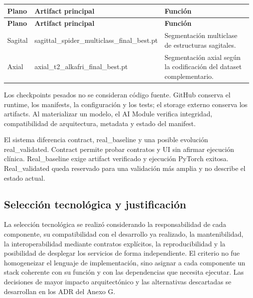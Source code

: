 {\footnotesize
\setlength{\LTleft}{0pt}
\setlength{\LTright}{0pt}
\setlength{\tabcolsep}{2pt}
\renewcommand{\arraystretch}{1.18}
\label{tab:arch-artifacts-modelos}
\begin{longtable}{>{\raggedright\arraybackslash}p{} >{\raggedright\arraybackslash}p{} >{\raggedright\arraybackslash}p{}}
\hline
\textbf{Plano} & \textbf{Artifact principal} & \textbf{Función} \\
\hline
\endfirsthead
\hline
\textbf{Plano} & \textbf{Artifact principal} & \textbf{Función} \\
\hline
\endhead
\hline
\endfoot
Sagital & sagittal\_spider\_multiclass\_final\_best.pt & Segmentación multiclase de estructuras sagitales. \\
Axial & axial\_t2\_alkafri\_final\_best.pt & Segmentación axial según la codificación del dataset complementario. \\
\hline
\end{longtable}
}

Los checkpoints pesados no se consideran código fuente. GitHub conserva el runtime, los manifests, la configuración y los tests; el storage externo conserva los artifacts. Al materializar un modelo, el AI Module verifica integridad, compatibilidad de arquitectura, metadata y estado del manifest.

El sistema diferencia contract, real\_baseline y una posible evolución real\_validated. Contract permite probar contratos y UI sin afirmar ejecución clínica. Real\_baseline exige artifact verificado y ejecución PyTorch exitosa. Real\_validated queda reservado para una validación más amplia y no describe el estado actual.

\subsection{Selección tecnológica y justificación}

La selección tecnológica se realizó considerando la responsabilidad de cada componente, su compatibilidad con el desarrollo ya realizado, la mantenibilidad, la interoperabilidad mediante contratos explícitos, la reproducibilidad y la posibilidad de desplegar los servicios de forma independiente. El criterio no fue homogeneizar el lenguaje de implementación, sino asignar a cada componente un stack coherente con su función y con las dependencias que necesita ejecutar. Las decisiones de mayor impacto arquitectónico y las alternativas descartadas se desarrollan en los ADR del Anexo G.

